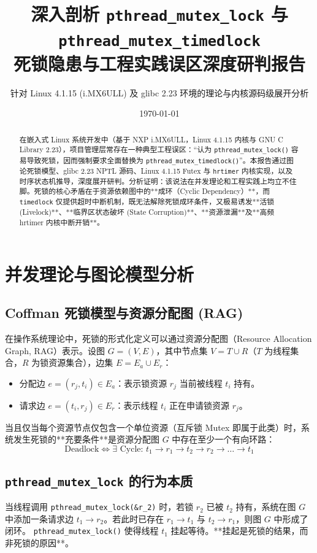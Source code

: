 \documentclass[12pt,a4paper]{article}
\title{\textbf{深入剖析 \texttt{pthread\_mutex\_lock} 与 \texttt{pthread\_mutex\_timedlock}\\死锁隐患与工程实践误区深度研判报告}}
\author{针对 Linux 4.1.15 (i.MX6ULL) 及 glibc 2.23 环境的理论与内核源码级展开分析}
\date{\today}
\begin{document}
\maketitle

\begin{abstract}
在嵌入式 Linux 系统开发中（基于 NXP i.MX6ULL，Linux 4.1.15 内核与 GNU C Library 2.23），项目管理层常存在一种典型工程误区：“认为 \texttt{pthread\_mutex\_lock()} 容易导致死锁，因而强制要求全面替换为 \texttt{pthread\_mutex\_timedlock()}”。本报告通过图论死锁模型、glibc 2.23 NPTL 源码、Linux 4.1.15 Futex 与 \texttt{hrtimer} 内核实现，以及时序状态机推导，深度展开研判。分析证明：该说法在并发理论和工程实践上均立不住脚。死锁的核心矛盾在于资源依赖图中的**成环（Cyclic Dependency）**，而 \texttt{timedlock} 仅提供超时中断机制，既无法解除死锁成环条件，又极易诱发**活锁 (Livelock)**、**临界区状态破坏 (State Corruption)**、**资源泄漏**及**高频 hrtimer 内核中断开销**。
\end{abstract}

\tableofcontents
\newpage

\section{并发理论与图论模型分析}

\subsection{Coffman 死锁模型与资源分配图 (RAG)}
在操作系统理论中，死锁的形式化定义可以通过资源分配图（Resource Allocation Graph, RAG）表示。设图 $G = (V, E)$，其中节点集 $V = T \cup R$（$T$ 为线程集合，$R$ 为锁资源集合），边集 $E = E_a \cup E_r$：
\begin{itemize}
    \item 分配边 $e = (r_j, t_i) \in E_a$：表示锁资源 $r_j$ 当前被线程 $t_i$ 持有。
    \item 请求边 $e = (t_i, r_j) \in E_r$：表示线程 $t_i$ 正在申请锁资源 $r_j$。
\end{itemize}

当且仅当每个资源节点仅包含一个单位资源（互斥锁 Mutex 即属于此类）时，系统发生死锁的**充要条件**是资源分配图 $G$ 中存在至少一个有向环路：
\[
\text{Deadlock} \iff \exists \text{ Cycle: } t_1 \to r_1 \to t_2 \to r_2 \to \dots \to t_1
\]

\subsection{\texttt{pthread\_mutex\_lock} 的行为本质}
当线程调用 \texttt{pthread\_mutex\_lock(\&r\_2)} 时，若锁 $r_2$ 已被 $t_2$ 持有，系统在图 $G$ 中添加一条请求边 $t_1 \to r_2$。若此时已存在 $r_1 \to t_1$ 与 $t_2 \to r_1$，则图 $G$ 中形成了闭环。
\texttt{pthread\_mutex\_lock()} 使得线程 $t_1$ 挂起等待。**挂起是死锁的结果，而非死锁的原因**。
\end{document}
